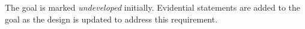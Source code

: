 \noindent
The goal is marked {\em undeveloped} initially.
Evidential statements are added to the goal as
the design is updated to address this requirement.


